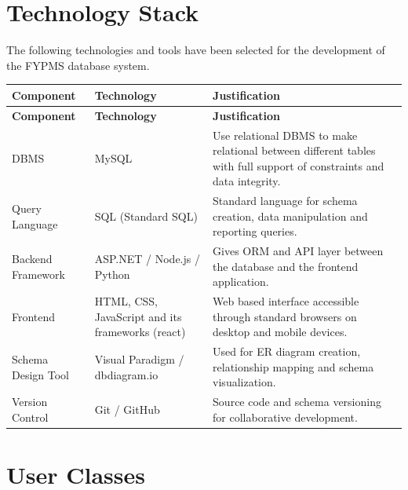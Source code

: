 \documentclass[12pt,a4paper]{report}
\begin{document}
\section{Technology Stack}

The following technologies and tools have been selected for the development of the
FYPMS database system.

\vspace{6pt}
\begin{longtable}{|L{2.8cm}|L{3.2cm}|p{7.2cm}|} 
    \hline
    \textbf{Component} &
    \textbf{Technology} &
    \textbf{Justification} \\
    \hline
    \endfirsthead
    \hline
    \textbf{Component} &
    \textbf{Technology} &
    \textbf{Justification} \\
    \hline
    \endhead
    
    DBMS &
     MySQL &
    Use relational DBMS  to make relational between different tables with full support of constraints and data integrity. \\
    \hline
    
    Query Language &
    SQL (Standard SQL) &
    Standard language for schema creation, data manipulation and
    reporting queries. \\
    \hline
    
    Backend Framework &
    ASP.NET / Node.js / Python &
    Gives ORM and API layer between the database and the frontend application. \\
    \hline
    
    Frontend &
    HTML, CSS, JavaScript and its frameworks (react) &
    Web based interface accessible through standard browsers on desktop and mobile devices. \\
    \hline
    
    Schema Design Tool &
    Visual Paradigm / dbdiagram.io &
    Used for ER diagram creation, relationship mapping and schema visualization. \\
    \hline
    
    Version Control &
    Git / GitHub &
    Source code and schema versioning for collaborative development. \\
    \hline

\end{longtable}

\section{User Classes}
\end{document}
